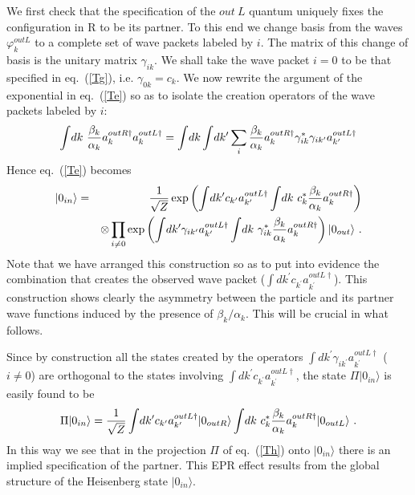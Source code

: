 \documentclass[12pt,oneside]{report}
\def\ket#1{|#1\rangle}
\def\p {\prime}
\begin{document}
We first check that the specification of the $out\ L$ 
quantum uniquely fixes the configuration
in R to be its partner. To this end we 
change basis from the waves $\varphi_k^{out  L}$ to a
complete set of wave packets labeled by $i$. The matrix of this change of basis is the
unitary matrix $\gamma_{ik}$. We shall take the wave packet
$i=0$ to be that specified in eq.~(\ref{Tg}), i.e.
$\gamma_{0k}=c_k$. We now rewrite the argument of the
exponential in eq.~(\ref{Te}) so as to isolate the creation
operators of the wave packets labeled by $i$:
\begin{equation}
\int\! dk\ {\beta_k\over \alpha_k} a_k^{out R\dagger}a_k^{out
L\dagger} =\int\! dk\int\! dk^\p \sum_i
{\beta_k\over \alpha_k} a_k^{out R\dagger}
\gamma_{ik}^*\gamma_{ik^\p} a_{k^\p}^{out L\dagger}\label{labeli}
\end{equation}
Hence eq.~(\ref{Te}) becomes
\begin{eqnarray}
\ket{0_{in}}&=&
{1 \over \sqrt{Z}}
\exp \left(\int\! dk^\p c_{k^\p}a_{k^\p}^{out L\dagger}
\int\! dk\ c_k^*{\beta_k\over \alpha_k} a_k^{out R\dagger}
\right)\nonumber\\
&\ & \otimes\prod_{i\neq 0}
\exp \left(\int\! dk^\p \gamma_{ik^\p} a_{k^\p}^{out L\dagger}
\int\! dk\ \gamma_{ik}^*{\beta_k\over \alpha_k} a_k^{out
R\dagger} \right)\ket{0_{out}}\ .
\label{Tl}
\end{eqnarray}
Note that we have arranged this construction so as to put into evidence the
combination that creates the observed wave packet 
($\int\! dk^\p c_{k^\p}a_{k^\p}^{out L\dagger}$). This  construction
shows clearly
the asymmetry 
 between the particle and its partner wave functions induced by the presence
of ${\beta_k / \alpha_k}$.
This will be crucial in what follows.
 
Since by construction all the
states created by the operators $\int\! dk^\p \gamma_{ik^\p} a_{k^\p}^{out
L\dagger}$ ($i\neq 0$) are orthogonal to the states involving $\int\! dk^\p
c_{k^\p}a_{k^\p}^{out L\dagger}$, the state 
$\Pi \ket{0_{in}}$ is easily found to be 
\begin{equation}
\Pi \ket{0_{in}} =
{1 \over \sqrt{Z}}
\int\! dk^\p c_{k^\p}a_{k^\p}^{out L\dagger}\ket{0_{out R}}
\int\! dk\ c_k^*{\beta_k\over \alpha_k} a_k^{out R\dagger}
\ket{0_{out L}}\ .
\label{Tm}\end{equation}
In this way we see that in the projection $\Pi$ of eq.~(\ref{Th}) onto
$\ket{0_{in}}$ there is an implied specification
of the partner. This EPR \cite{epr} effect results from the global structure of
the Heisenberg state $\ket{0_{in}}$.
\end{document}
